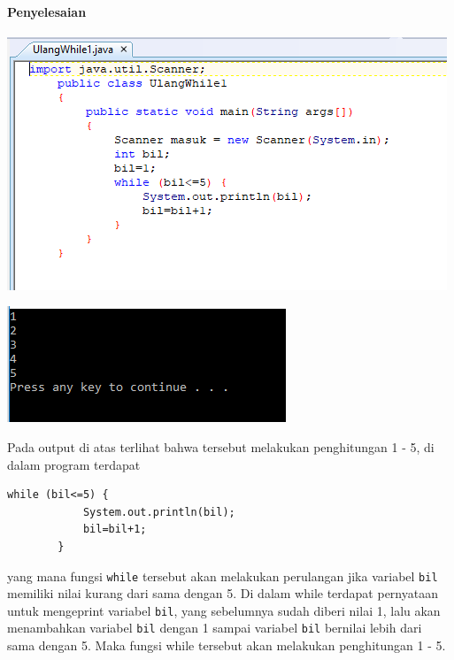 \documentclass[a4paper,12pt]{article}
\begin{document}
\paragraph{Penyelesaian\\}
\begin{center}
\includegraphics[width=\linewidth]{Capture1}\\
\end{center}
\newpage
\begin{center}
 \includegraphics[scale=1]{Capture2}
\end{center}
Pada output di atas terlihat bahwa tersebut melakukan penghitungan 1 - 5, di dalam program terdapat
\begin{lstlisting}[frame=single]
while (bil<=5) {
            System.out.println(bil);
            bil=bil+1;
        }
\end{lstlisting}
yang mana fungsi \texttt{while} tersebut akan melakukan perulangan jika variabel \texttt{bil} memiliki nilai kurang dari sama dengan 5. Di dalam while terdapat pernyataan untuk mengeprint variabel \texttt{bil}, yang sebelumnya sudah diberi nilai 1, lalu akan menambahkan variabel \texttt{bil} dengan 1 sampai variabel \texttt{bil} bernilai lebih dari sama dengan 5. Maka fungsi while tersebut akan melakukan penghitungan 1 - 5.
\end{document}
